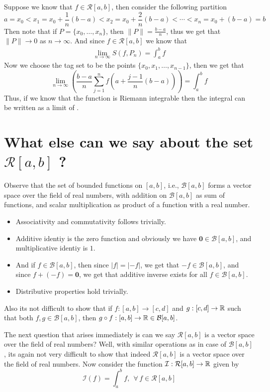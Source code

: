 Suppose we know that $f \in \mathcal{R}[a,b]$, then consider the following partition \[ a = x_0 < x_1 = x_0 + \frac{1}{n}(b-a) < x_2 = x_0 + \frac{2}{n}(b-a) < \cdots < x_n = x_0 + (b-a) = b \]
Then note that if $P = \{x_0,\dots,x_n\}$, then $\|P\| = \frac{b-a}{n}$, thus we get that $\|P\| \to 0$ as $n \to \infty$. And since $f \in \mathcal{R}[a,b]$ we know that 
\begin{align*}
    \lim_{n\to\infty} S(f,P_n) = \int_a^b f
\end{align*}
Now we choose the tag set to be the points $\{x_0,x_1,\dots,x_{n-1}\}$, then we get that 
\begin{equation}\label{eq6:feb4}
    \lim_{n\to\infty}\left(\frac{b-a}{n}\sum_{j=1}^n f \left(a+\frac{j-1}{n}(b-a) \right)\right) = \int_a^b f
\end{equation}
Thus, if we know that the function is Riemann integrable then the integral can be written as a limit of .

\section{What else can we say about the set $\mathcal{R}[a,b]$ ?}

Observe that the set of bounded functions on $[a,b]$, i.e., $\mathcal{B}[a,b]$ forms a vector space over the field of real numbers, with addition on $\mathcal{B}[a,b]$ as sum of functions, and scalar multiplication as product of a function with a real number. 
\begin{itemize}
    \item Associativity and commutativity follows trivially.
    \item Additive identiy is the zero function and obviously we have $\mathbf{0} \in \mathcal{B}[a,b]$, and multiplicative identiy is $1$.
    \item And if $f \in \mathcal{B}[a,b]$, then since $|f| = |-f|$, we get that $-f \in \mathcal{B}[a,b]$, and since $f + (-f) = \mathbf{0}$, we get that additive inverse exists for all $f \in \mathcal{B}[a,b]$.
    \item Distributive properties hold trivially.
\end{itemize} 
Also its not difficult to show that if $f : [a,b] \to [c,d]$ and $g : [c,d] \to \mathbb{R}$ such that both $f,g \in \mathcal{B}[a,b]$, then $g \circ f : [a,b] \to \mathbb{R} \in \mathcal{B}[a,b]$.

The next question that arises immediately is can we say $\mathcal{R}[a,b]$ is a vector space over the field of real numbers? Well, with similar operations as in case of $\mathcal{B}[a,b]$, its again not very difficult to show that indeed $\mathcal{R}[a,b]$ is a vector space over the field of real numbers. Now consider the function $\mathcal{I} : \mathcal{R}[a,b] \to \mathbb{R}$ given by 
\begin{equation}\label{eq7:feb4}
    \mathcal{I}(f) = \int_a^b f, \ \ \forall \, f \in \mathcal{R}[a,b]
\end{equation}

